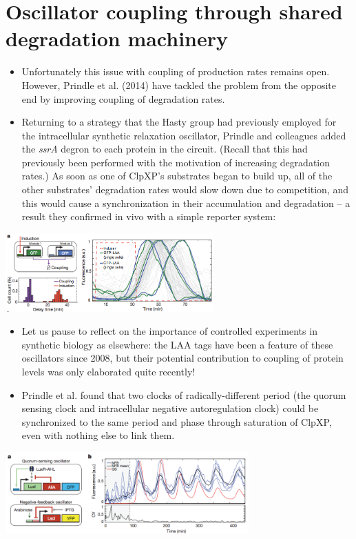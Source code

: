 \documentclass{article}
\begin{document}
\section*{Oscillator coupling through shared degradation machinery}
\begin{itemize}
\item Unfortunately this issue with coupling of production rates remains open. However, Prindle et al. (2014) have tackled the problem from the opposite end by improving coupling of degradation rates.
\item Returning to a strategy that the Hasty group had previously employed for the intracellular synthetic relaxation oscillator, Prindle and colleagues added the \textit{ssrA} degron to each protein in the circuit. (Recall that this had previously been performed with the motivation of increasing degradation rates.) As soon as one of ClpXP's substrates began to build up, all of the other substrates' degradation rates would slow down due to competition, and this would cause a synchronization in their accumulation and degradation -- a result they confirmed in vivo with a simple reporter system:
\end{itemize}
\begin{center}
\includegraphics[width=0.6\textwidth]{prindle_reporter.png}
\end{center}
\begin{itemize}
\item Let us pause to reflect on the importance of controlled experiments in synthetic biology as elsewhere: the LAA tags have been a feature of these oscillators since 2008, but their potential contribution to coupling of protein levels was only elaborated quite recently!
\item Prindle et al. found that two clocks of radically-different period (the quorum sensing clock and intracellular negative autoregulation clock) could be synchronized to the same period and phase through saturation of ClpXP, even with nothing else to link them.
\end{itemize}
\begin{center}
\includegraphics[width=0.7\textwidth]{prindle_clocks.png}
\end{center}
\end{document}
